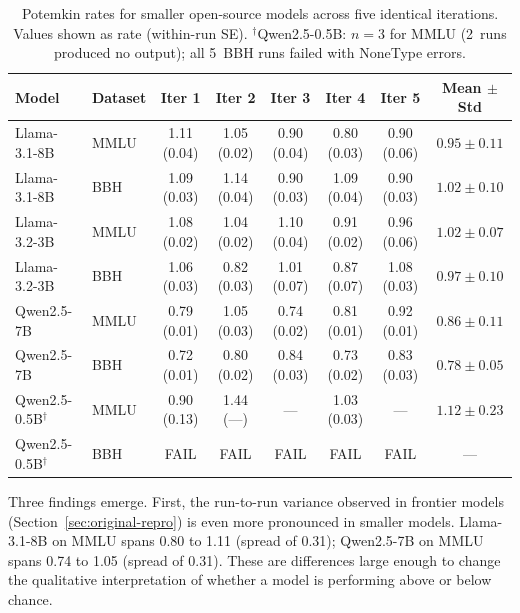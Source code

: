 \documentclass[sigconf,authordraft]{acmart}
\begin{document}
\begin{table}[t]
\centering
\small
\setlength{\tabcolsep}{5pt}
\renewcommand{\arraystretch}{1.2}

\begin{tabular}{ll ccccc c}
\toprule
\textbf{Model} & \textbf{Dataset} & \textbf{Iter 1} & \textbf{Iter 2} & \textbf{Iter 3} & \textbf{Iter 4} & \textbf{Iter 5} & \textbf{Mean $\pm$ Std} \\
\midrule

Llama-3.1-8B & MMLU
& 1.11 (0.04) & 1.05 (0.02) & 0.90 (0.04) & 0.80 (0.03) & 0.90 (0.06) & $0.95 \pm 0.11$ \\

Llama-3.1-8B & BBH
& 1.09 (0.03) & 1.14 (0.04) & 0.90 (0.03) & 1.09 (0.04) & 0.90 (0.03) & $1.02 \pm 0.10$ \\

\rowcolor{gray!10}
Llama-3.2-3B & MMLU
& 1.08 (0.02) & 1.04 (0.02) & 1.10 (0.04) & 0.91 (0.02) & 0.96 (0.06) & $1.02 \pm 0.07$ \\

\rowcolor{gray!10}
Llama-3.2-3B & BBH
& 1.06 (0.03) & 0.82 (0.03) & 1.01 (0.07) & 0.87 (0.07) & 1.08 (0.03) & $0.97 \pm 0.10$ \\

Qwen2.5-7B & MMLU
& 0.79 (0.01) & 1.05 (0.03) & 0.74 (0.02) & 0.81 (0.01) & 0.92 (0.01) & $0.86 \pm 0.11$ \\

Qwen2.5-7B & BBH
& 0.72 (0.01) & 0.80 (0.02) & 0.84 (0.03) & 0.73 (0.02) & 0.83 (0.03) & $0.78 \pm 0.05$ \\

\rowcolor{gray!10}
Qwen2.5-0.5B$^\dagger$ & MMLU
& 0.90 (0.13) & 1.44 (---) & --- & 1.03 (0.03) & --- & $1.12 \pm 0.23$ \\

\rowcolor{gray!10}
Qwen2.5-0.5B$^\dagger$ & BBH
& FAIL & FAIL & FAIL & FAIL & FAIL & --- \\

\bottomrule
\end{tabular}

\caption{Potemkin rates for smaller open-source models across five identical iterations. Values shown as rate (within-run SE). $^\dagger$Qwen2.5-0.5B: $n{=}3$ for MMLU (2~runs produced no output); all 5~BBH runs failed with NoneType errors.}
\label{tab:iteration_results}

\end{table}

Three findings emerge. First, the run-to-run variance observed in frontier models (Section~\ref{sec:original-repro}) is even more pronounced in smaller models. Llama-3.1-8B on MMLU spans 0.80 to 1.11 (spread of 0.31); Qwen2.5-7B on MMLU spans 0.74 to 1.05 (spread of 0.31). These are differences large enough to change the qualitative interpretation of whether a model is performing above or below chance.
\end{document}
